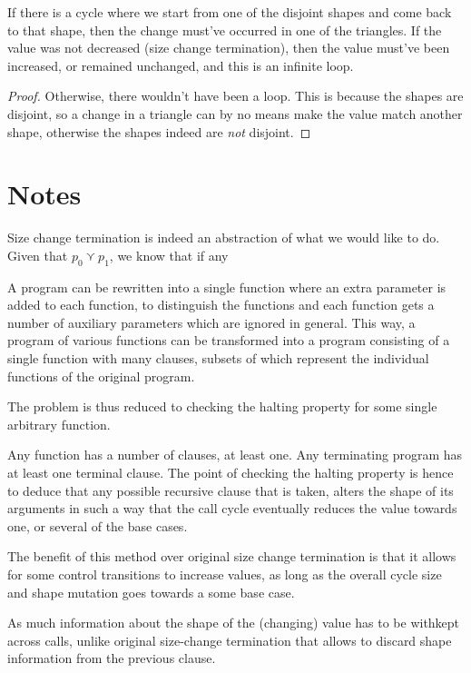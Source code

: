 If there is a cycle where we start from one of the disjoint shapes and come
back to that shape, then the change must've occurred in one of the triangles.
If the value was not decreased (size change termination), then the value
must've been increased, or remained unchanged, and this is an infinite loop.


\begin{proof} Otherwise, there wouldn't have been a loop. This is because the
shapes are disjoint, so a change in a triangle can by no means make the value
match another shape, otherwise the shapes indeed are \emph{not} disjoint.
\end{proof}





\newpage

\section{Notes}

Size change termination is indeed an abstraction of what we would like to do.
Given that $p_0\curlyvee p_1$, we know that if any 


A program can be rewritten into a single function where an extra parameter is
added to each function, to distinguish the functions and each function gets a
number of auxiliary parameters which are ignored in general. This way, a
program of various functions can be transformed into a program consisting of a
single function with many clauses, subsets of which represent the individual
functions of the original program.

The problem is thus reduced to checking the halting property for some single
arbitrary function.

Any function has a number of clauses, at least one. Any terminating program has
at least one terminal clause. The point of checking the halting property is
hence to deduce that any possible recursive clause that is taken, alters the
shape of its arguments in such a way that the call cycle eventually reduces the
value towards one, or several of the base cases.

The benefit of this method over original size change termination is that it
allows for some control transitions to increase values, as long as the overall
cycle size and shape mutation goes towards a some base case.

As much information about the shape of the (changing) value has to be withkept
across calls, unlike original size-change termination that allows to discard
shape information from the previous clause.

